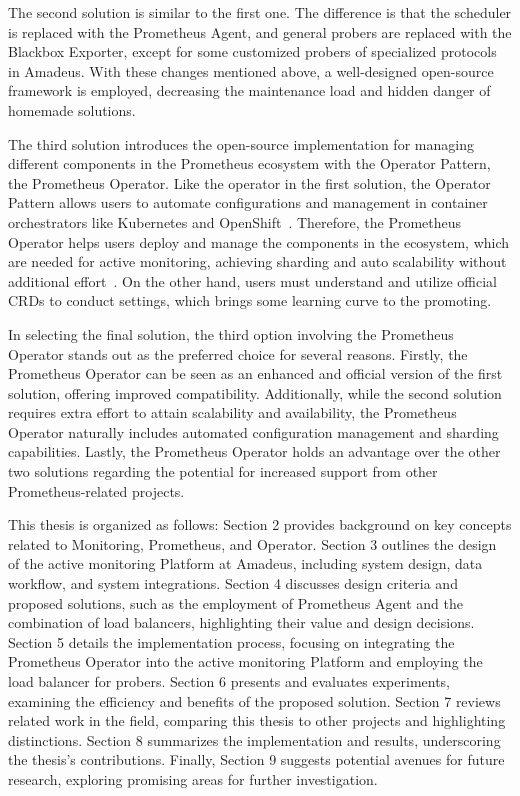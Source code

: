 The second solution is similar to the first one. The difference is that the scheduler is replaced with the Prometheus Agent, and general probers are replaced with the Blackbox Exporter, except for some customized probers of specialized protocols in Amadeus. With these changes mentioned above, a well-designed open-source framework is employed, decreasing the maintenance load and hidden danger of homemade solutions. 

The third solution introduces the open-source implementation for managing different components in the Prometheus ecosystem with the Operator Pattern, the Prometheus Operator. Like the operator in the first solution, the Operator Pattern allows users to automate configurations and management in container orchestrators like Kubernetes and OpenShift~\parencite{kubernetesOperatorPattern}. Therefore, the Prometheus Operator helps users deploy and manage the components in the ecosystem, which are needed for active monitoring, achieving sharding and auto scalability without additional effort~\parencite{prometheusoperatorIntroduction2020}. On the other hand, users must understand and utilize official \ac{CRD}s to conduct settings, which brings some learning curve to the promoting. 

In selecting the final solution, the third option involving the Prometheus Operator stands out as the preferred choice for several reasons. Firstly, the Prometheus Operator can be seen as an enhanced and official version of the first solution, offering improved compatibility. Additionally, while the second solution requires extra effort to attain scalability and availability, the Prometheus Operator naturally includes automated configuration management and sharding capabilities. Lastly, the Prometheus Operator holds an advantage over the other two solutions regarding the potential for increased support from other Prometheus-related projects.

This thesis is organized as follows: Section 2 provides background on key concepts related to Monitoring, Prometheus, and Operator. Section 3 outlines the design of the active monitoring Platform at Amadeus, including system design, data workflow, and system integrations. Section 4 discusses design criteria and proposed solutions, such as the employment of Prometheus Agent and the combination of load balancers, highlighting their value and design decisions. Section 5 details the implementation process, focusing on integrating the Prometheus Operator into the active monitoring Platform and employing the load balancer for probers. Section 6 presents and evaluates experiments, examining the efficiency and benefits of the proposed solution. Section 7 reviews related work in the field, comparing this thesis to other projects and highlighting distinctions. Section 8 summarizes the implementation and results, underscoring the thesis's contributions. Finally, Section 9 suggests potential avenues for future research, exploring promising areas for further investigation. 


